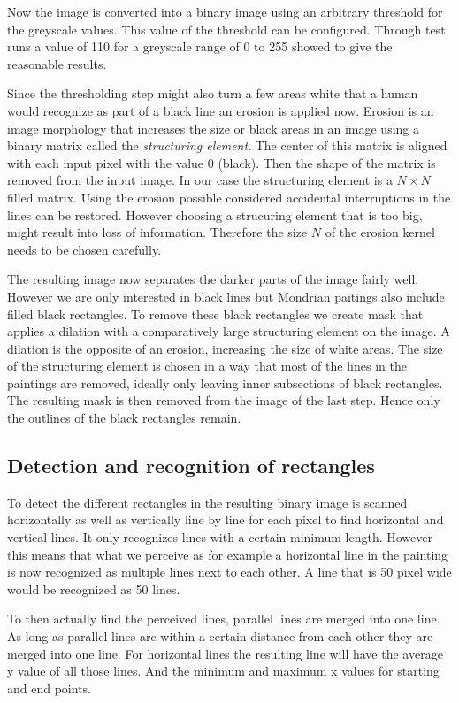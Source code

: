 Now the image is converted into a binary image using an arbitrary threshold for the
greyscale values. This value of the threshold can be configured. Through test
runs a value of 110 for a greyscale range of 0 to 255 showed to give the reasonable
results.

Since the thresholding step might also turn a few areas white that a human would
recognize as part of a black line an erosion is applied now. Erosion is an image
morphology that increases the size or black areas in an image using a binary
matrix called the \textit{structuring element}. The center of this matrix is
aligned with each input pixel with the value 0 (black). Then the shape of the
matrix is removed from the input image. In our case the structuring element is a
$N\times N$ filled matrix. Using the erosion possible considered accidental
interruptions in the lines can be restored. However choosing a strucuring
element that is too big, might result into loss of information. Therefore the
size $N$ of the erosion kernel needs to be chosen carefully.

The resulting image now separates the darker parts of the image fairly well.
However we are only interested in black lines but Mondrian paitings also include
filled black rectangles. To remove these black rectangles we create mask that
applies a dilation with a comparatively large structuring element on the image.
A dilation is the opposite of an erosion, increasing the size of white areas.
The size of the structuring element is chosen in a way that most of the lines in
the paintings are removed, ideally only leaving inner subsections of black
rectangles. The resulting mask is then removed from the image of the last step.
Hence only the outlines of the black rectangles remain.

\subsection{Detection and recognition of rectangles}

To detect the different rectangles in the resulting binary image is scanned
horizontally as well as vertically line by line for each pixel to find
horizontal and vertical lines. It only recognizes lines with a certain minimum
length. However this means that what we perceive as for example a horizontal
line in the painting is now recognized as multiple lines next to each other. A
line that is 50 pixel wide would be recognized as 50 lines.

To then actually find the perceived lines, parallel lines are merged into one
line. As long as parallel lines are within a certain distance from each other
they are merged into one line. For horizontal lines the resulting line will have
the average y value of all those lines. And the minimum and maximum x values for
starting and end points.

